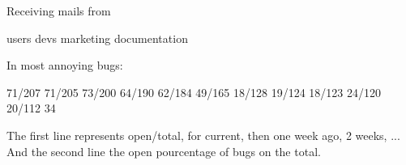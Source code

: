 Receiving mails from


users
devs 
marketing
documentation



In most annoying bugs:

71/207 71/205 73/200 64/190 62/184 49/165  18/128 19/124 18/123 24/120 20/112
     34%


The first line represents open/total, for current, then one week ago, 2 weeks, ...
And the second line the open pourcentage of bugs on the total.
